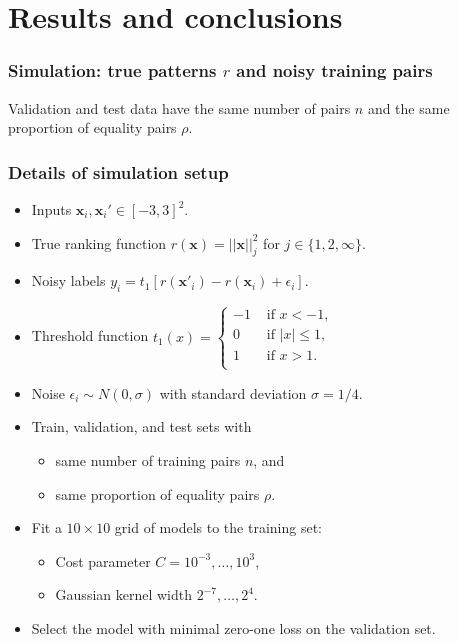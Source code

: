 \documentclass{beamer}
\begin{document}
\section{Results and conclusions}

\begin{frame}
  \frametitle{Simulation: true patterns $r$ and noisy training pairs}
  \begin{minipage}{1.0\linewidth}
    \hskip -0.5cm  Validation and test data
    have the same number of pairs $n$ and the same proportion of
    equality pairs $\rho$.
  \end{minipage}
\end{frame}

\begin{frame}
  \frametitle{Details of simulation setup}
  \begin{itemize}
    \item Inputs $\mathbf x_i,\mathbf x_i'\in[-3,3]^2$.
    \item True ranking function $r(\mathbf x)=||\mathbf x||^2_j$ 
      for $j\in\{1,2,\infty\}$.
    \item Noisy labels $y_i=t_1[r(\mathbf x'_i)-r(\mathbf x_i)+\epsilon_i]$.
  \item Threshold function
$
  \label{eq:threshold}
  t_1(x) = 
  \begin{cases}
    -1 & \text{ if } x < -1, \\
    0 & \text{ if } |x| \leq 1, \\
    1 & \text{ if } x > 1. \\
  \end{cases}
$
\item Noise $\epsilon_i\sim N(0, \sigma)$ with standard deviation
  $\sigma=1/4$.
\item Train, validation, and test sets with
  \begin{itemize}
    \item same number of training pairs $n$, and
    \item same proportion of equality pairs $\rho$.
  \end{itemize}
\item Fit a $10\times 10$ grid of models to the training
set:
\begin{itemize}
\item Cost parameter $C=10^{-3},\dots,10^3$,
\item Gaussian kernel width $2^{-7},\dots,2^4$.
\end{itemize}
\item Select the model with minimal zero-one loss on the validation set.
  \end{itemize}
\end{frame}
\end{document}
